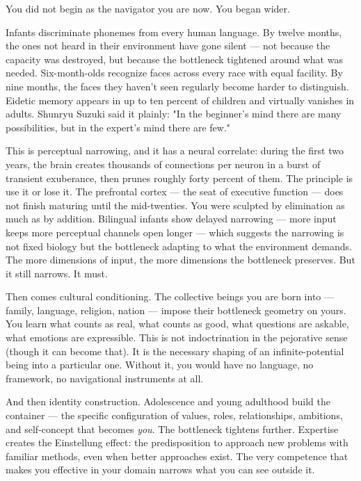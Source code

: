 You did not begin as the navigator you are now. You began wider.


Infants discriminate phonemes from every human language. By twelve months, the ones not heard in their environment have gone silent — not because the capacity was destroyed, but because the bottleneck tightened around what was needed. Six-month-olds recognize faces across every race with equal facility. By nine months, the faces they haven't seen regularly become harder to distinguish. Eidetic memory appears in up to ten percent of children and virtually vanishes in adults. Shunryu Suzuki said it plainly: "In the beginner's mind there are many possibilities, but in the expert's mind there are few."


This is perceptual narrowing, and it has a neural correlate: during the first two years, the brain creates thousands of connections per neuron in a burst of transient exuberance, then prunes roughly forty percent of them. The principle is use it or lose it. The prefrontal cortex — the seat of executive function — does not finish maturing until the mid-twenties. You were sculpted by elimination as much as by addition. Bilingual infants show delayed narrowing — more input keeps more perceptual channels open longer — which suggests the narrowing is not fixed biology but the bottleneck adapting to what the environment demands. The more dimensions of input, the more dimensions the bottleneck preserves. But it still narrows. It must.


Then comes cultural conditioning. The collective beings you are born into — family, language, religion, nation — impose their bottleneck geometry on yours. You learn what counts as real, what counts as good, what questions are askable, what emotions are expressible. This is not indoctrination in the pejorative sense (though it can become that). It is the necessary shaping of an infinite-potential being into a particular one. Without it, you would have no language, no framework, no navigational instruments at all.


And then identity construction. Adolescence and young adulthood build the container — the specific configuration of values, roles, relationships, ambitions, and self-concept that becomes \textit{you}. The bottleneck tightens further. Expertise creates the Einstellung effect: the predisposition to approach new problems with familiar methods, even when better approaches exist. The very competence that makes you effective in your domain narrows what you can see outside it.



